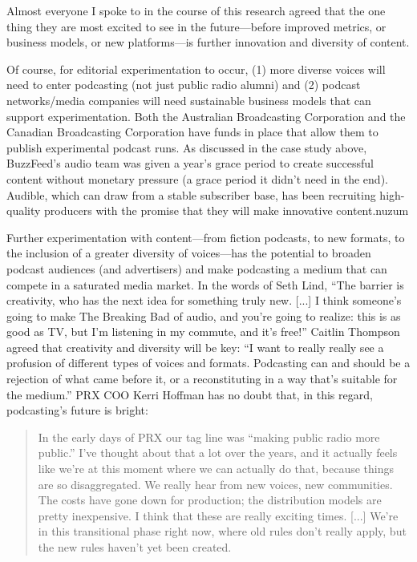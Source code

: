\documentclass[notoc, symmetric, nobib, nols]{towcenter-guideto-book}
\begin{document}
Almost everyone I spoke to in the course of this research agreed that the one thing they are most excited to see in the future---before improved metrics, or business models, or new platforms---is further innovation and diversity of content. 

Of course, for editorial experimentation to occur, (1) more diverse voices will need to enter podcasting (not just public radio alumni) and (2) podcast networks/media companies will need sustainable business models that can support experimentation. Both the Australian Broadcasting Corporation and the Canadian Broadcasting Corporation have funds in place that allow them to publish experimental podcast runs. As discussed in the case study above, BuzzFeed's audio team was given a year's grace period to create successful content without monetary pressure (a grace period it didn't need in the end).\autocite{wb} Audible, which can draw from a stable subscriber base, has been recruiting high-quality producers with the promise that they will make innovative content.{nuzum} 

Further experimentation with content---from fiction podcasts, to new formats, to the inclusion of a greater diversity of voices---has the potential to broaden podcast audiences (and advertisers) and make podcasting a medium that can compete in a saturated media market. In the words of Seth Lind, ``The barrier is creativity, who has the next idea for something truly new. [...] I think someone's going to make The Breaking Bad of audio, and you're going to realize: this is as good as TV, but I'm listening in my commute, and it's free!''\autocite{lind} Caitlin Thompson agreed that creativity and diversity will be key: ``I want to really really see a profusion of different types of voices and formats. Podcasting can and should be a rejection of what came before it, or a reconstituting in a way that's suitable for the medium.''\autocite{thompson} PRX COO Kerri Hoffman has no doubt that, in this regard, podcasting's future is bright:

\begin{quote}
In the early days of PRX our tag line was ``making public radio more public.'' I've thought about that a lot over the years, and it actually feels like we're at this moment where we can actually do that, because things are so disaggregated. We really hear from new voices, new communities. The costs have gone down for production; the distribution models are pretty inexpensive. I think that these are really exciting times. [...] We're in this transitional phase right now, where old rules don't really apply, but the new rules haven't yet been created.\autocite{hoffman}
\end{quote}
\end{document}
